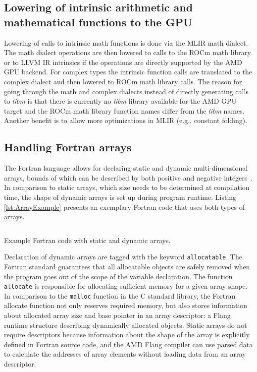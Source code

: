 \documentclass[acmtog,natbib=false]{acmart}
\newcommand{\code}[1]{\texttt{#1}\xspace}
\newcommand{\trademark}[0]{\texttrademark\xspace}
\begin{document}
\subsection{Lowering of intrinsic arithmetic and mathematical functions to the GPU}
\label{sec:FortranIntrinsics}
Lowering of calls to intrinsic math functions is done via the \ac{MLIR} math dialect.
The math dialect operations are then lowered to calls to the ROCm\trademark math library or to LLVM \ac{IR} intrinsics if the operations are directly supported by the AMD GPU backend.
For complex types the intrinsic function calls are translated to the complex dialect and then lowered to ROCm\trademark math library calls.
The reason for going through the math and complex dialects instead of directly generating calls to \textit{libm} is that there is currently no \textit{libm} library available for the AMD GPU target and the ROCm\trademark math library function names differ from the \textit{libm} names. Another benefit is to allow more optimizations in \ac{MLIR} (e.g., constant folding).
\subsection{Handling Fortran arrays}
The Fortran language allows for declaring static and dynamic multi-dimensional arrays, bounds of which can be described by both positive and negative integers~\cite{F2023}.
In comparison to static arrays, which size needs to be determined at compilation time, the shape of dynamic arrays is set up during program runtime.
Listing \ref{lst:ArrayExample} presents an exemplary Fortran code that uses both types of arrays.

\begin{listing}[t]
\inputminted{Fortran}{code/arrays.f90}
\caption{Example Fortran code with static and dynamic arrays.}
\label{lst:ArrayExample}
\end{listing}

Declaration of dynamic arrays are tagged with the keyword \code{allocatable}.
The Fortran standard guarantees that all allocatable objects are safely removed when the program goes out of the scope of the variable declaration.
The function \code{allocate} is responsible for allocating sufficient memory for a given array shape.
In comparison to the \code{malloc} function in the C standard library, the Fortran allocate function not only reserves required memory, but also stores information about allocated array size and base pointer in an array descriptor: a Flang runtime structure describing dynamically allocated objects.
Static arrays do not require descriptors because information about the shape of the array is explicitly defined in Fortran source code, and the AMD Flang compiler can use parsed data to calculate the addresses of array elements without loading data from an array descriptor.
\end{document}
